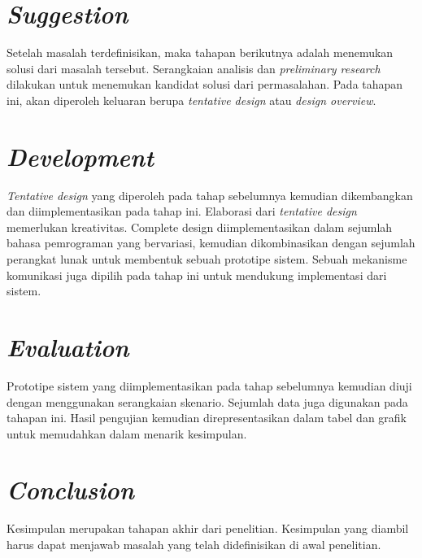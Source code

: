 \section{\textit{Suggestion}}
Setelah masalah terdefinisikan, maka tahapan berikutnya adalah menemukan solusi dari masalah tersebut. Serangkaian analisis dan \textit{preliminary research} dilakukan untuk menemukan kandidat solusi dari permasalahan. Pada tahapan ini, akan diperoleh keluaran berupa \textit{tentative design} atau \textit{design overview}.


\section{\textit{Development}}
\textit{Tentative design} yang diperoleh pada tahap sebelumnya kemudian dikembangkan dan diimplementasikan pada tahap ini. Elaborasi dari \textit{tentative design} memerlukan kreativitas. Complete design diimplementasikan dalam sejumlah bahasa pemrograman yang bervariasi, kemudian dikombinasikan dengan sejumlah perangkat lunak untuk membentuk sebuah prototipe sistem. Sebuah mekanisme komunikasi juga dipilih pada tahap ini untuk mendukung implementasi dari sistem.


\section{\textit{Evaluation}}
Prototipe sistem yang diimplementasikan pada tahap sebelumnya kemudian diuji dengan menggunakan serangkaian skenario. Sejumlah data juga digunakan pada tahapan ini. Hasil pengujian kemudian direpresentasikan dalam tabel dan grafik untuk memudahkan dalam menarik kesimpulan.


\section{\textit{Conclusion}}
Kesimpulan merupakan tahapan akhir dari penelitian. Kesimpulan yang diambil harus dapat menjawab masalah yang telah didefinisikan di awal penelitian.





